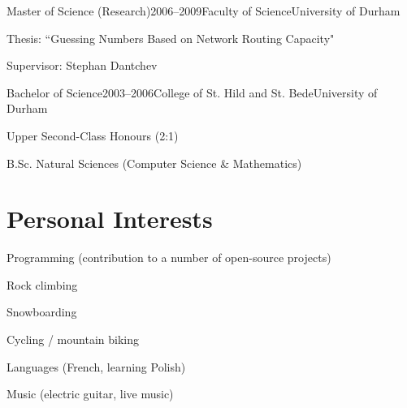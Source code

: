 \documentclass{cv}
\begin{document}
\begin{experience}{Master of Science (Research)}{2006--2009}{Faculty of Science}{University of Durham}
\item Thesis: ``Guessing Numbers Based on Network Routing Capacity"
\item Supervisor: Stephan Dantchev
\end{experience}

\begin{experience}{Bachelor of Science}{2003--2006}{College of St. Hild and St. Bede}{University of Durham}
\item Upper Second-Class Honours (2:1)
\item B.Sc. Natural Sciences (Computer Science \& Mathematics)
\end{experience}


\section{Personal Interests}

\begin{experience}{}{}{}{}
\item Programming (contribution to a number of open-source projects)
\item Rock climbing
\item Snowboarding
\item Cycling / mountain biking
\item Languages (French, learning Polish)
\item Music (electric guitar, live music)
\end{experience}
\end{document}
